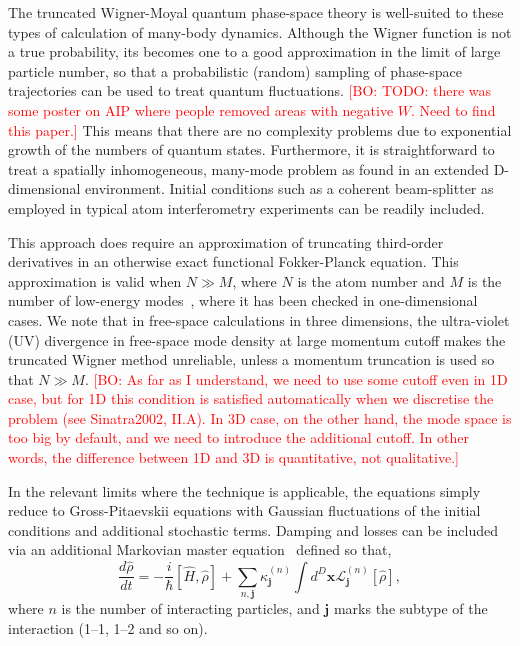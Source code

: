 \documentclass[aps,prl,twocolumn,showpacs,amsmath,amssymb,superscriptaddress]{revtex4-1}
\newcommand{\bogdansremark}[1]{\textcolor{red}{{[}BO: #1{]}}}
\newcommand{\xvec}{\boldsymbol{x}}
\newcommand{\jvec}{\boldsymbol{j}}
\begin{document}
The truncated Wigner-Moyal quantum phase-space theory is well-suited
to these types of calculation of many-body dynamics.
Although the Wigner function is not a true probability,
its becomes one to a good approximation in the limit of large particle number,
so that a probabilistic (random) sampling of phase-space trajectories
can be used to treat quantum fluctuations.
	\bogdansremark{TODO: there was some poster on AIP where people removed areas with negative $W$.
	Need to find this paper.}
This means that there are no complexity problems due to exponential growth
of the numbers of quantum states.
Furthermore, it is straightforward to treat a spatially inhomogeneous,
many-mode problem as found in an extended D-dimensional environment.
Initial conditions such as a coherent beam-splitter
as employed in typical atom interferometry experiments can be readily included.

This approach does require an approximation of truncating third-order derivatives
in an otherwise exact functional Fokker-Planck equation.
This approximation is valid when $N \gg M$, where $N$ is the atom number and
$M$ is the number of low-energy modes~\cite{Drummond1993,Sinatra2002,Norrie2006},
where it has been checked in one-dimensional cases.
We note that in free-space calculations in three dimensions,
the ultra-violet (UV) divergence in free-space mode density at large momentum cutoff
makes the truncated Wigner method unreliable,
unless a momentum truncation is used so that $N \gg M$.
	\bogdansremark{As far as I understand, we need to use some cutoff even in 1D case,
	but for 1D this condition is satisfied automatically when we discretise the problem
	(see Sinatra2002, II.A).
	In 3D case, on the other hand, the mode space is too big by default,
	and we need to introduce the additional cutoff.
	In other words, the difference between 1D and 3D is quantitative, not qualitative.}

In the relevant limits where the technique is applicable,
the equations simply reduce to Gross-Pitaevskii equations with Gaussian fluctuations
of the initial conditions and additional stochastic terms.
Damping and losses can be included via an additional Markovian master equation~\cite{Jack2002}
defined so that,
\begin{equation}
	\frac{d\hat{\rho}}{dt} = -\frac{i}{\hbar} \left[ \hat{H}, \hat{\rho} \right] +
	\sum_{n,\jvec} \kappa_{\jvec}^{(n)}
	\int d^D\xvec \mathcal{L}_{\jvec}^{(n)} \left[ \hat{\rho} \right],
\end{equation}
where $n$ is the number of interacting particles,
and $\jvec$ marks the subtype of the interaction (1--1, 1--2 and so on).
\end{document}
